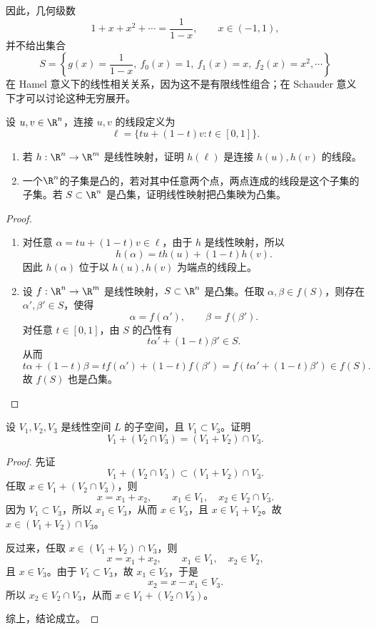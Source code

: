 	因此，几何级数
	\[
	1+x+x^2+\cdots=\frac{1}{1-x},
	\qquad x\in(-1,1),
	\]
	并不给出集合
	\[
	S=\left\{g(x)=\frac{1}{1-x},\ f_0(x)=1,\ f_1(x)=x,\ f_2(x)=x^2,\cdots\right\}
	\]
	在 Hamel 意义下的线性相关关系，因为这不是有限线性组合；在 Schauder 意义下才可以讨论这种无穷展开。


\begin{problem}[线段与凸集]
	设 $u,v\in\R^n$，连接 $u,v$ 的线段定义为
	\[
	\ell=\{tu+(1-t)v:t\in[0,1]\}.
	\]
	\begin{enumerate}
		\item 若 $h:\R^n\to\R^m$ 是线性映射，证明 $h(\ell)$ 是连接 $h(u),h(v)$ 的线段。
		\item 一个$\R^n$的子集是凸的，若对其中任意两个点，两点连成的线段是这个子集的子集。若 $S\subset\R^n$ 是凸集，证明线性映射把凸集映为凸集。
	\end{enumerate}
\end{problem}

\begin{proof}
	\begin{enumerate}
		\item 对任意 $\alpha=tu+(1-t)v\in\ell$，由于 $h$ 是线性映射，所以
		\[
		h(\alpha)=t h(u)+(1-t)h(v).
		\]
		因此 $h(\alpha)$ 位于以 $h(u),h(v)$ 为端点的线段上。
		\item 设 $f:\R^n\to\R^m$ 是线性映射，$S\subset\R^n$ 是凸集。任取 $\alpha,\beta\in f(S)$，则存在 $\alpha',\beta'\in S$，使得
		\[
		\alpha=f(\alpha'),
		\qquad
		\beta=f(\beta').
		\]
		对任意 $t\in[0,1]$，由 $S$ 的凸性有
		\[
		t\alpha'+(1-t)\beta'\in S.
		\]
		从而
		\[
		t\alpha+(1-t)\beta
		=t f(\alpha')+(1-t)f(\beta')
		=f(t\alpha'+(1-t)\beta')\in f(S).
		\]
		故 $f(S)$ 也是凸集。
	\end{enumerate}
\end{proof}

\begin{problem}
	设 $V_1,V_2,V_3$ 是线性空间 $L$ 的子空间，且 $V_1\subset V_3$。证明
	\[
	V_1+(V_2\cap V_3)=(V_1+V_2)\cap V_3.
	\]
\end{problem}

\begin{proof}
	先证
	\[
	V_1+(V_2\cap V_3)\subset (V_1+V_2)\cap V_3.
	\]
	任取 $x\in V_1+(V_2\cap V_3)$，则
	\[
	x=x_1+x_2,
	\qquad x_1\in V_1,
	\quad x_2\in V_2\cap V_3.
	\]
	因为 $V_1\subset V_3$，所以 $x_1\in V_3$，从而 $x\in V_3$，且 $x\in V_1+V_2$。故
	$x\in (V_1+V_2)\cap V_3$。
	
	反过来，任取 $x\in (V_1+V_2)\cap V_3$，则
	\[
	x=x_1+x_2,
	\qquad x_1\in V_1,
	\quad x_2\in V_2,
	\]
	且 $x\in V_3$。由于 $V_1\subset V_3$，故 $x_1\in V_3$，于是
	\[
	x_2=x-x_1\in V_3.
	\]
	所以 $x_2\in V_2\cap V_3$，从而 $x\in V_1+(V_2\cap V_3)$。
	
	综上，结论成立。
\end{proof}

